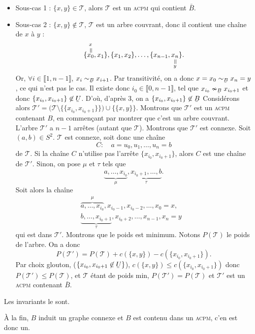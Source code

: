 \begin{prv}
\begin{description}
\begin{enumerate}
\begin{itemize}
							\begin{itemize}
								\item Sous-cas 1 : $\{x,y\} \in \mathcal{T}$, alors $\mathcal{T}$\/ est un \textsc{acpm} qui contient $\bar{B}$.
								\item Sous-cas 2 : $\{x,y\}  \not\in \mathcal{T}$, $\mathcal{T}$\/ est un arbre couvrant, donc il contient une chaîne de $x$\/ à $y$\/ : \[
											\{\overset{\substack{x\\[-1mm]\vrt=}}{x_0},x_1\},\{x_1,x_2\},\ldots,\{x_{n-1},\underset{\substack{\vrt=\\y}}{x_n}\}
									.\]
									Or, $\forall i \in \llbracket 1,n-1 \rrbracket$, $x_i \sim_{\ubar{B}} x_{i+1}$. Par transitivité, on a donc $x = x_0 \sim_{\ubar{B}} x_n = y$, ce qui n'est pas le cas.
									Il existe donc $i_0 \in \llbracket 0,n-1 \rrbracket$, tel que $x_{i_0} \nsim_{\ubar{B}} x_{i_0 + 1}$\/ et donc $\{x_{i_0}, x_{i_0 + 1}\} \not\in \ubar{U}$. D'où, d'après 3, on a $\{x_{i_0}, x_{i_0 + 1}\}  \not\in \ubar{B}$
									Considérons alors $\mathcal{T}' = \big(\mathcal{T} \setminus \{\!\{x_{i_0},x_{i_0+1}\}\!\}\big)  \cup \{\!\{x,y\}\!\}$. Montrons que $\mathcal{T}'$\/ est un \textsc{acpm} contenant $B$, en commençant par montrer que c'est un arbre couvrant. L'arbre $\mathcal{T}'$\/ a $n-1$\/ arrêtes (autant que $\mathcal{T}$). Montrons que $\mathcal{T}'$\/ est connexe.
									Soit $(a,b) \in S^2$. $\mathcal{T}$\/ est connexe, soit donc une chaîne \[
										C : \quad a = u_0, u_1, \ldots, u_n = b
									\] de $\mathcal{T}$. Si la chaîne $C$\/ n'utilise pas l'arrête $\{x_{i_0},x_{i_0+1}\}$, alors $C$\/ est une chaîne de $\mathcal{T}'$. Sinon, on pose $\mu$\/ et $\tau$\/ tels que \[
									\underbrace{a,\ldots,x_{i_0}}_{\mu},\underbrace{x_{i_0+1},\ldots,b}_{\tau}
									.\]
									Soit alors la chaîne
									\begin{align*}
										\overbrace{a,\ldots,x_{i_0}}^{\mu},x_{i_0-1},x_{i_0-2},\ldots,x_0 = x,&\\
										\underbrace{b,\ldots,x_{i_0 + 1}}_{\tau},x_{i_0+2},\ldots,x_{n-1},x_n=y&
									\end{align*}
									qui est dans $\mathcal{T}'$.
									Montrons que le poids est minimum. Notons $P(\mathcal{T})$\/ le poids de l'arbre. On a donc \[
										P(\mathcal{T}') = P(\mathcal{T}) + c(\{x,y\}) - c(\{x_{i_0},x_{i_0+1}\})
									.\] Par choix glouton, ($\{x_{i_0}, x_{i_0+1} \not\in \ubar{U}\}$), $c(\{x,y\}) \le c(\{x_{i_0},x_{i_0+1}\})$\/ donc $P(\mathcal{T}') \le P(\mathcal{T})$, et $\mathcal{T}$\/ étant de poids min, $P(\mathcal{T}') = P(\mathcal{T})$\/ et $\mathcal{T}'$\/ est un \textsc{acpm} contenant $\bar{B}$.
							\end{itemize}
					\end{itemize}
			\end{enumerate}
	\end{description}

	Les invariants le sont.
\end{prv}

À la fin, $B$\/ induit un graphe connexe et $B$\/ est contenu dans un \textsc{acpm}, c'en est donc un.

